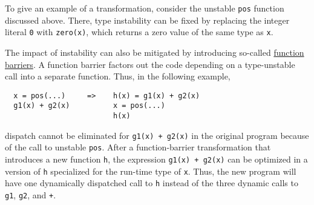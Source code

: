 \documentclass[twocolumn]{article}
\begin{document}
To give an example of a transformation, consider the unstable
\texttt{pos} function discussed above. There, type instability can be
fixed by replacing the integer literal \texttt{0} with \texttt{zero(x)},
which returns a zero value of the same type as \texttt{x}.

The impact of instability can also be mitigated by introducing so-called
\href{https://docs.julialang.org/en/v1/manual/performance-tips/#kernel-functions}{function barriers}.
A function barrier factors out the code
depending on a type-unstable call into a separate function. Thus, in the
following example,
\begin{verbatim}
  x = pos(...)     =>    h(x) = g1(x) + g2(x)
  g1(x) + g2(x)          x = pos(...)
                         h(x)
\end{verbatim}
dispatch cannot be eliminated for \texttt{g1(x)\ +\ g2(x)} in the
original program because of the call to unstable \texttt{pos}. After a
function-barrier transformation that introduces a new function
\texttt{h}, the expression \texttt{g1(x)\ +\ g2(x)} can be optimized in
a version of \texttt{h} specialized for the run-time type of \texttt{x}.
Thus, the new program will have one dynamically dispatched call to
\texttt{h} instead of the three dynamic calls to \texttt{g1},
\texttt{g2}, and \texttt{+}.


\vspace*{-2.7em}


\end{document}

